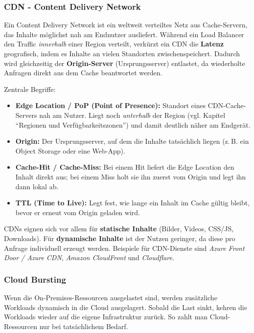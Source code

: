 \subsubsection{CDN - Content Delivery Network}
Ein Content Delivery Network ist ein weltweit verteiltes Netz aus Cache-Servern,
das Inhalte möglichst nah am Endnutzer ausliefert. Während ein Load Balancer den
Traffic \emph{innerhalb} einer Region verteilt, verkürzt ein CDN die \textbf{Latenz}
geografisch, indem es Inhalte an vielen Standorten zwischenspeichert. Dadurch wird
gleichzeitig der \textbf{Origin-Server} (Ursprungsserver) entlastet, da wiederholte
Anfragen direkt aus dem Cache beantwortet werden.

Zentrale Begriffe:
\begin{itemize}
    \item \textbf{Edge Location / PoP (Point of Presence):} Standort eines
          CDN-Cache-Servers nah am Nutzer. Liegt noch \emph{unterhalb} der Region
          (vgl. Kapitel \enquote{Regionen und Verfügbarkeitszonen}) und damit
          deutlich näher am Endgerät.
    \item \textbf{Origin:} Der Ursprungsserver, auf dem die Inhalte tatsächlich
          liegen (z.\,B. ein Object Storage oder eine Web-App).
    \item \textbf{Cache-Hit / Cache-Miss:} Bei einem Hit liefert die Edge Location
          den Inhalt direkt aus; bei einem Miss holt sie ihn zuerst vom Origin und
          legt ihn dann lokal ab.
    \item \textbf{TTL (Time to Live):} Legt fest, wie lange ein Inhalt im Cache
          gültig bleibt, bevor er erneut vom Origin geladen wird.
\end{itemize}

CDNs eignen sich vor allem für \textbf{statische Inhalte} (Bilder, Videos,
CSS/JS, Downloads). Für \textbf{dynamische Inhalte} ist der Nutzen geringer, da
diese pro Anfrage individuell erzeugt werden. Beispiele für CDN-Dienste sind
\textit{Azure Front Door / Azure CDN}, \textit{Amazon CloudFront} und
\textit{Cloudflare}.

\subsubsection{Cloud Bursting}
Wenn die On-Premises-Ressourcen ausgelastet sind, werden zusätzliche Workloads dynamisch in die Cloud ausgelagert. Sobald die Last sinkt, kehren die Workloads wieder auf die eigene Infrastruktur zurück. So zahlt man Cloud-Ressourcen nur bei tatsächlichem Bedarf.

